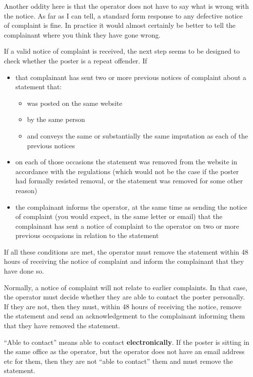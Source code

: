 \documentclass[]{article}
\begin{document}
Another oddity here is that the operator does not have to say what is wrong with the notice. As far as I can tell, a standard form response to any defective notice of complaint is fine. In practice it would almost certainly be better to tell the complainant where you think they have gone wrong.

If a valid notice of complaint is received, the next step seems to be designed to check whether the poster is a repeat offender. If

\begin{itemize}
\item that complainant has sent two or more previous notices of complaint about a statement that:
  \begin{itemize}
  \item was posted on the same website
  \item by the same person
  \item and conveys the same or substantially the same imputation as each of the previous notices
  \end{itemize}
\item on each of those occasions the statement was removed from the website in accordance with the regulations (which would not be the case if the poster had formally resisted removal, or the statement was removed for some other reason)
\item the complainant informs the operator, at the same time as sending the notice of complaint (you would expect, in the same letter or email) that the complainant has sent a notice of complaint to the operator on two or more previous occqasions in relation to the statement
\end{itemize}

If all these conditions are met, the operator must remove the statement within 48 hours of receiving the notice of complaint and inform the complainant that they have done so.

Normally, a notice of complaint will not relate to earlier complaints. In that case, the operator must decide whether they are able to contact the poster personally. If they are not, then they must, within 48 hours of receiving the notice, remove the statement and send an acknowledgement to the complainant informing them that they have removed the statement.

``Able to contact'' means able to contact {\bf electronically}. If the poster is sitting in the same office as the operator, but the operator does not have an email address etc for them, then they are not ``able to contact'' them and must remove the statement.
\end{document}
